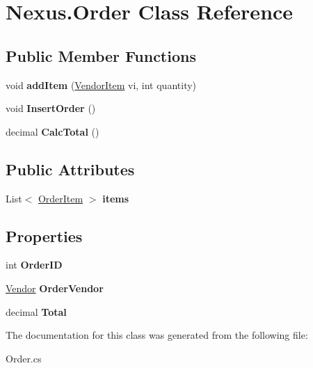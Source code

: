 \hypertarget{class_nexus_1_1_order}{}\section{Nexus.\+Order Class Reference}
\label{class_nexus_1_1_order}
\subsection*{Public Member Functions}
\begin{DoxyCompactItemize}
\item 
\mbox{\label{class_nexus_1_1_order_ac3837ea85162c2370ecd133ff9d782d8}} 
void {\bfseries add\+Item} (\mbox{\hyperlink{class_nexus_1_1_vendor_item}{Vendor\+Item}} vi, int quantity)
\item 
\mbox{\label{class_nexus_1_1_order_ac63f22cc6f4eb3370cff14c3f18b8e47}} 
void {\bfseries Insert\+Order} ()
\item 
\mbox{\label{class_nexus_1_1_order_a20b17ecce67caf3faeb03bd7ceae522c}} 
decimal {\bfseries Calc\+Total} ()
\end{DoxyCompactItemize}
\subsection*{Public Attributes}
\begin{DoxyCompactItemize}
\item 
\mbox{\label{class_nexus_1_1_order_aabc45753e9e62a24556d7ce25978956d}} 
List$<$ \mbox{\hyperlink{class_nexus_1_1_order_item}{Order\+Item}} $>$ {\bfseries items}
\end{DoxyCompactItemize}
\subsection*{Properties}
\begin{DoxyCompactItemize}
\item 
\mbox{\label{class_nexus_1_1_order_aeac1d6ed2fb2e89388a05a6f4aee9165}} 
int {\bfseries Order\+ID}
\item 
\mbox{\label{class_nexus_1_1_order_a6261c8688f518a5b7e0ddc802fa97e30}} 
\mbox{\hyperlink{class_nexus_1_1_vendor}{Vendor}} {\bfseries Order\+Vendor}
\item 
\mbox{\label{class_nexus_1_1_order_a29e7d8479bd7335d3bfb61c007865a2f}} 
decimal {\bfseries Total}
\end{DoxyCompactItemize}


The documentation for this class was generated from the following file\+:\begin{DoxyCompactItemize}
\item 
Order.\+cs\end{DoxyCompactItemize}
